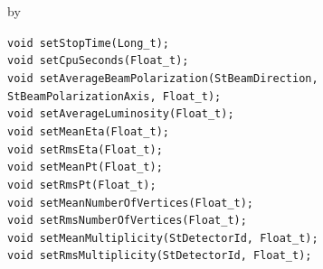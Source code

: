 \documentclass[twoside]{article}
\newcommand{\entrylabel}[1]{\mbox{\textbf{{#1}}}\hfil}%
\newenvironment{entry}
{\begin{list}{}%
    {\renewcommand{\makelabel}{\entrylabel}%
     \setlength{\labelwidth}{90pt}%
     \setlength{\leftmargin}{\labelwidth}
     \advance\leftmargin by \labelsep%
      }%
    }%
  {\end{list}}
\newcommand{\Entrylabel}[1]%
{\raisebox{0pt}[1ex][0pt]{\makebox[\labelwidth][l]%
    {\parbox[t]{\labelwidth}{\hspace{0pt}\textbf{{#1}}}}}}
\newenvironment{Entry}%
{\renewcommand{\entrylabel}{\Entrylabel}\begin{entry}}%
  {\end{entry}}
\begin{document}
\begin{Entry}
    \verb+void setStopTime(Long_t);+\\
    \verb+void setCpuSeconds(Float_t);+\\
    \verb+void setAverageBeamPolarization(StBeamDirection, StBeamPolarizationAxis, Float_t);+\\
    \verb+void setAverageLuminosity(Float_t);+\\
    \verb+void setMeanEta(Float_t);+\\
    \verb+void setRmsEta(Float_t);+\\
    \verb+void setMeanPt(Float_t);+\\
    \verb+void setRmsPt(Float_t);+\\
    \verb+void setMeanNumberOfVertices(Float_t);+\\
    \verb+void setRmsNumberOfVertices(Float_t);+\\
    \verb+void setMeanMultiplicity(StDetectorId, Float_t);+\\
    \verb+void setRmsMultiplicity(StDetectorId, Float_t);+\\
\end{Entry}
\clearpage
\end{document}
